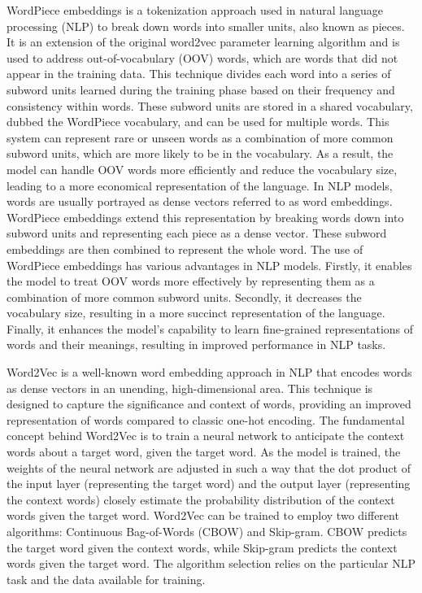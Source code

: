 WordPiece embeddings\cite{DBLP:journals/corr/WuSCLNMKCGMKSJL16} is a tokenization approach used in natural language processing (NLP) to break down words into smaller units, also known as pieces. It is an extension of the original word2vec parameter learning algorithm and is used to address out-of-vocabulary (OOV) words, which are words that did not appear in the training data.
This technique divides each word into a series of subword units learned during the training phase based on their frequency and consistency within words. These subword units are stored in a shared vocabulary, dubbed the WordPiece vocabulary, and can be used for multiple words.
This system can represent rare or unseen words as a combination of more common subword units, which are more likely to be in the vocabulary. As a result, the model can handle OOV words more efficiently and reduce the vocabulary size, leading to a more economical representation of the language.
In NLP models, words are usually portrayed as dense vectors referred to as word embeddings. WordPiece embeddings extend this representation by breaking words down into subword units and representing each piece as a dense vector. These subword embeddings are then combined to represent the whole word.
The use of WordPiece embeddings has various advantages in NLP models. Firstly, it enables the model to treat OOV words more effectively by representing them as a combination of more common subword units. Secondly, it decreases the vocabulary size, resulting in a more succinct representation of the language. Finally, it enhances the model's capability to learn fine-grained representations of words and their meanings, resulting in improved performance in NLP tasks.


Word2Vec\cite{DBLP:journals/corr/Rong14} is a well-known word embedding approach in NLP that encodes words as dense vectors in an unending, high-dimensional area. This technique is designed to capture the significance and context of words, providing an improved representation of words compared to classic one-hot encoding.
The fundamental concept behind Word2Vec is to train a neural network to anticipate the context words about a target word, given the target word. As the model is trained, the weights of the neural network are adjusted in such a way that the dot product of the input layer (representing the target word) and the output layer (representing the context words) closely estimate the probability distribution of the context words given the target word.
Word2Vec can be trained to employ two different algorithms: Continuous Bag-of-Words (CBOW) and Skip-gram. CBOW predicts the target word given the context words, while Skip-gram predicts the context words given the target word. The algorithm selection relies on the particular NLP task and the data available for training.

